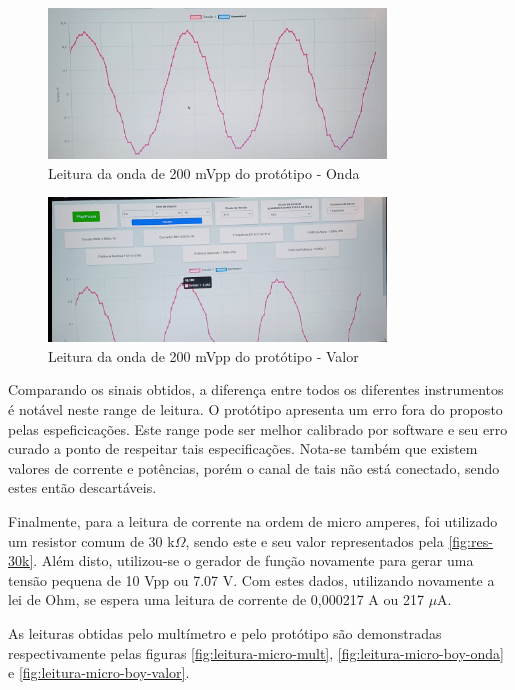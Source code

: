 \begin{figure}[htb!]
    \caption{Leitura da onda de 200 mVpp do protótipo - Onda}
    \label{fig:leitura-200-boy-onda}
    \includegraphics[width=0.8\textwidth]{figuras/leitura-200-boy-onda.png}
    \fonte{}
\end{figure}

\begin{figure}[htb!]
    \caption{Leitura da onda de 200 mVpp do protótipo - Valor}
    \label{fig:leitura-200-boy-valor}
    \includegraphics[width=0.8\textwidth]{figuras/leitura-200-boy-valor.png}
    \fonte{}
\end{figure}

Comparando os sinais obtidos, a diferença entre todos os diferentes instrumentos é notável neste range de leitura. O protótipo apresenta um erro fora do proposto pelas espeficicações. Este range pode ser melhor calibrado por software e seu erro curado a ponto de respeitar tais especificações. Nota-se também que existem valores de corrente e potências, porém o canal de tais não está conectado, sendo estes então descartáveis.

Finalmente, para a leitura de corrente na ordem de micro amperes, foi utilizado um resistor comum de 30 k$\Omega$, sendo este e seu valor representados pela \autoref{fig:res-30k}. Além disto, utilizou-se o gerador de função novamente para gerar uma tensão pequena de 10 Vpp ou 7.07 V. Com estes dados, utilizando novamente a lei de Ohm, se espera uma leitura de corrente de 0,000217 A ou 217 $\mu$A.

As leituras obtidas pelo multímetro e pelo protótipo são demonstradas respectivamente pelas figuras \ref{fig:leitura-micro-mult}, \ref{fig:leitura-micro-boy-onda} e \ref{fig:leitura-micro-boy-valor}.

